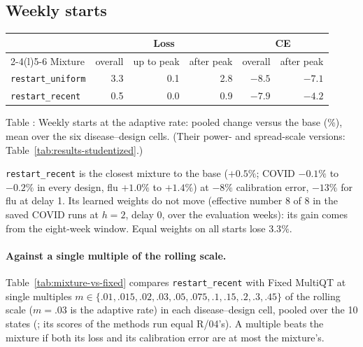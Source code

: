 \documentclass[11pt,a4paper]{article}
\theoremstyle{definition}
\theoremstyle{remark}
\begin{document}
\subsection{Weekly starts}
\label{sec:results-weighting}
\begin{center}\small
\renewcommand{\arraystretch}{1.15}
\begin{tabular}{@{}lrrrrr@{}}
\toprule
 & \multicolumn{3}{c}{Loss} & \multicolumn{2}{c}{CE}\\
\cmidrule(lr){2-4}\cmidrule(l){5-6}
Mixture & overall & up to peak & after peak & overall & after peak\\
\midrule
\texttt{restart\_uniform} & 3.3 & 0.1 & 2.8 & $-8.5$ & $-7.1$\\
\texttt{restart\_recent}  & 0.5 & 0.0 & 0.9 & $-7.9$ & $-4.2$\\
\bottomrule
\end{tabular}
\end{center}
\label{tab:results-weighting}
\begin{center}\small Table \thetable: Weekly starts at the adaptive rate:
pooled change versus the base (\%), mean over the six disease--design
cells. (Their power- and spread-scale versions: Table~\ref{tab:results-studentized}.)
\end{center}

\texttt{restart\_recent} is the closest mixture to the base ($+0.5\%$;
COVID $-0.1\%$ to $-0.2\%$ in every design, flu $+1.0\%$ to $+1.4\%$) at
$-8\%$ calibration error, $-13\%$ for flu at delay 1. Its learned weights do
not move (effective number $8$ of $8$ in the saved COVID runs at $h=2$, delay
0, over the evaluation weeks): its gain comes from the eight-week window.
Equal weights on all starts lose $3.3\%$.

\paragraph{Against a single multiple of the rolling scale.}
Table~\ref{tab:mixture-vs-fixed} compares \texttt{restart\_recent} with
Fixed MultiQT at single multiples
$m\in\{.01,.015,.02,.03,.05,.075,.1,.15,.2,.3,.45\}$ of the rolling scale
($m=.03$ is the adaptive rate) in each disease--design cell, pooled over
the 10 states (;
its scores of the methods run equal R/04's). A multiple beats the mixture
if both its loss and its calibration error are at most the mixture's.
\end{document}
